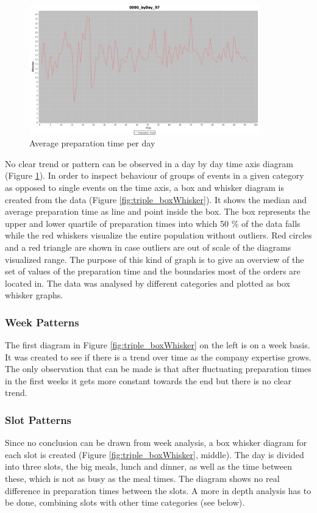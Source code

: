 \begin{figure}[h]
\begin{center}
\includegraphics[width=10cm]{images/0000_byDay_97.png}
\caption{Average preparation time per day}
\label{fig:0000_byDay_97}
\end{center}
\end{figure}


No clear trend or pattern can be observed in a day by day time axis diagram (Figure \ref{fig:0000_byDay_97}). In order to inspect behaviour of groups of events in a given category as opposed to single events on the time axis, a box and whisker diagram is created from the data (Figure \ref{fig:triple_boxWhisker}). It shows the median and average preparation time as line and point inside the box. The box represents the upper and lower quartile of preparation times into which 50 \% of the data falls while the red whiskers visualize the entire population without outliers. Red circles and a red triangle are shown in case outliers are out of scale of the diagrams visualized range. The purpose of this kind of graph is to give an overview of the set of values of the preparation time and the boundaries most of the orders are located in. The data was analysed by different categories and plotted as box whisker graphs.\newline
\subsubsection{Week Patterns}
The first diagram in Figure \ref{fig:triple_boxWhisker} on the left is on a week basis. It was created to see if there is a trend over time as the company expertise grows. The only observation that can be made is that after fluctuating preparation times in the first weeks it gets more constant towards the end but there is no clear trend.
\subsubsection{Slot Patterns}
Since no conclusion can be drawn from week analysis, a box whisker diagram for each slot is created (Figure \ref{fig:triple_boxWhisker}, middle). The day is divided into three slots, the big meals, lunch and dinner, as well as the time between these, which is not as busy as the meal times. The diagram shows no real difference in preparation times between the slots. A more in depth analysis has to be done, combining slots with other time categories (see below).
